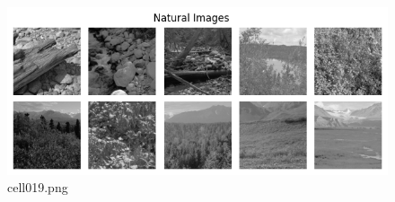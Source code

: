 \begin{figure}[ht]
	\centering
	\includegraphics[scale=0.8, max width=\linewidth]{./fig/energy-based-model/sparse-coding/cell019.png}
	\caption{cell019.png}
	\label{cell019.png}
\end{figure}